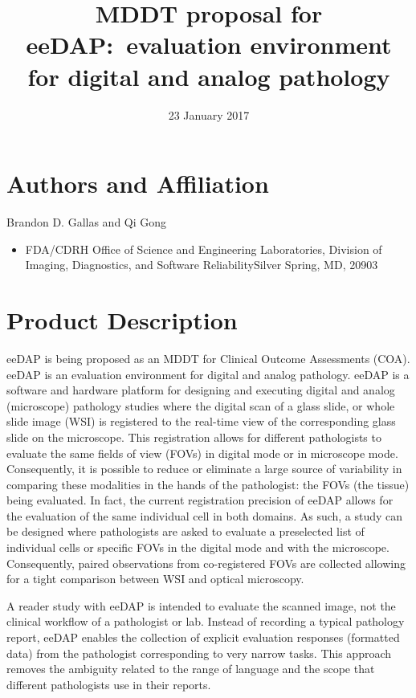 \documentclass{article}%
\begin{document}
\title{MDDT proposal for eeDAP:\ evaluation environment for digital and analog pathology}
\date{23 January 2017}
\maketitle

\section{Authors and Affiliation}

Brandon D. Gallas and Qi Gong

\begin{itemize}
\item FDA/CDRH Office of Science and Engineering Laboratories, Division of
Imaging, Diagnostics, and Software Reliability\newline Silver Spring, MD, 20903
\end{itemize}

\section{Product Description}

\label{product-description}

eeDAP is being proposed as an MDDT for Clinical Outcome Assessments (COA).
eeDAP is an evaluation environment for digital and analog pathology. eeDAP is
a software and hardware platform for designing and executing digital and
analog (microscope) pathology studies where the digital scan of a glass slide,
or whole slide image (WSI) is registered to the real-time view of the
corresponding glass slide on the microscope. This registration allows for
different pathologists to evaluate the same fields of view (FOVs) in digital
mode or in microscope mode. Consequently, it is possible to reduce or
eliminate a large source of variability in comparing these modalities in the
hands of the pathologist: the FOVs (the tissue) being evaluated. In fact, the
current registration precision of eeDAP allows for the evaluation of the same
individual cell in both domains. As such, a study can be designed where
pathologists are asked to evaluate a preselected list of individual cells or
specific FOVs in the digital mode and with the microscope. Consequently,
paired observations from co-registered FOVs are collected allowing for a tight
comparison between WSI and optical microscopy.

A reader study with eeDAP is intended to evaluate the scanned image, not the
clinical workflow of a pathologist or lab. Instead of recording a typical
pathology report, eeDAP enables the collection of explicit evaluation
responses (formatted data) from the pathologist corresponding to very narrow
tasks. This approach removes the ambiguity related to the range of language
and the scope that different pathologists use in their reports.
\end{document}
